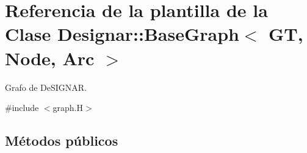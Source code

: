 \hypertarget{class_designar_1_1_base_graph}{}\section{Referencia de la plantilla de la Clase Designar\+:\+:Base\+Graph$<$ GT, Node, Arc $>$}
\label{class_designar_1_1_base_graph}


Grafo de De\+S\+I\+G\+N\+AR.  




{\ttfamily \#include $<$graph.\+H$>$}

\subsection*{Métodos públicos}
